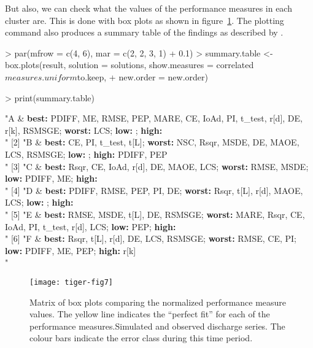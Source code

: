 \documentclass[a4paper]{article}
\begin{document}
But also, we can check what the values of the performance measures in
each cluster are. This is done with box plots as shown in
figure~\ref{fig:boxPlots}. The plotting command also produces a
summary table of the findings as described by \citet{Reusser2008a}.

\begin{Schunk}
\begin{Sinput}
> par(mfrow = c(4, 6), mar = c(2, 2, 3, 1) + 0.1)
> summary.table <- box.plots(result, solution = solutions, show.measures = correlated$measures.uniform$to.keep, 
+     new.order = new.order)
\end{Sinput}
\end{Schunk}
\begin{Schunk}
\begin{Sinput}
> print(summary.table)
\end{Sinput}
\begin{Soutput}
[1] "A & {\bf best:} PDIFF, ME, RMSE, PEP, MARE, CE, IoAd, PI, t_test, r[d], DE, r[k], RSMSGE; {\bf worst:} LCS; {\bf low:} ; {\bf high:} \\"
[2] "B & {\bf best:} CE, PI, t_test, t[L]; {\bf worst:} NSC, Rsqr, MSDE, DE, MAOE, LCS, RSMSGE; {\bf low:} ; {\bf high:} PDIFF, PEP\\"       
[3] "C & {\bf best:} Rsqr, CE, IoAd, r[d], DE, MAOE, LCS; {\bf worst:} RMSE, MSDE; {\bf low:} PDIFF, ME; {\bf high:} \\"                     
[4] "D & {\bf best:} PDIFF, RMSE, PEP, PI, DE; {\bf worst:} Rsqr, t[L], r[d], MAOE, LCS; {\bf low:} ; {\bf high:} \\"                        
[5] "E & {\bf best:} RMSE, MSDE, t[L], DE, RSMSGE; {\bf worst:} MARE, Rsqr, CE, IoAd, PI, t_test, r[d], LCS; {\bf low:} PEP; {\bf high:} \\" 
[6] "F & {\bf best:} Rsqr, t[L], r[d], DE, LCS, RSMSGE; {\bf worst:} RMSE, CE, PI; {\bf low:} PDIFF, ME, PEP; {\bf high:} r[k]\\"            
\end{Soutput}
\end{Schunk}

\begin{figure}
\begin{center}
\texttt{[image: tiger-fig7]}
\end{center}
\caption{Matrix of box plots comparing the normalized
performance measure values. The yellow line indicates the
``perfect fit'' for
each of the performance measures.Simulated and observed discharge series. The colour bars indicate
the error class during this time period.}
\label{fig:boxPlots}
\end{figure}



\end{document}
